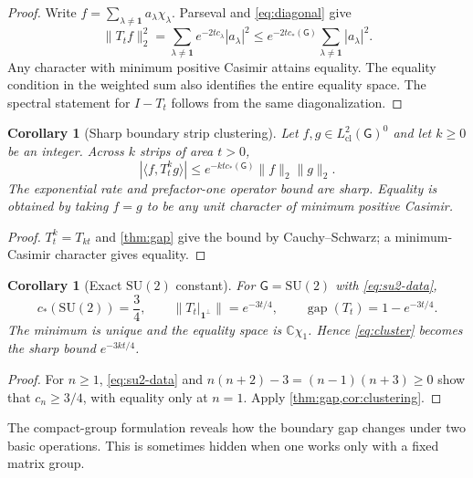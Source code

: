 \documentclass[11pt]{article}
\newtheorem{corollary}[theorem]{Corollary}
\theoremstyle{remark}
\newcommand{\SU}{\mathrm{SU}(2)}
\newcommand{\G}{\mathsf G}
\newcommand{\HclG}{L^2_{\mathrm{cl}}(\G)}
\newcommand{\ip}[2]{\langle #1,#2\rangle}
\begin{document}
\begin{proof}
Write $f=\sum_{\lambda\ne\mathbf1}a_\lambda\chi_\lambda$.  Parseval and
\eqref{eq:diagonal} give
\[
 \|T_tf\|_2^2
 =\sum_{\lambda\ne\mathbf1}e^{-2tc_\lambda}|a_\lambda|^2
 \le e^{-2tc_*(\G)}\sum_{\lambda\ne\mathbf1}|a_\lambda|^2.
\]
Any character with minimum positive Casimir attains equality.  The equality
condition in the weighted sum also identifies the entire equality space.  The
spectral statement for $I-T_t$ follows from the same diagonalization.
\end{proof}

\begin{corollary}[Sharp boundary strip clustering]\label{cor:clustering}
Let $f,g\in\HclG^0$ and let $k\ge0$ be an integer.  Across $k$ strips of area
$t>0$,
\begin{equation}\label{eq:cluster}
 |\ip{f}{T_t^kg}|\le e^{-ktc_*(\G)}\|f\|_2\|g\|_2.
\end{equation}
The exponential rate and prefactor-one operator bound are sharp.  Equality is
obtained by taking $f=g$ to be any unit character of minimum positive Casimir.
\end{corollary}

\begin{proof}
$T_t^k=T_{kt}$ and \cref{thm:gap} give the bound by Cauchy--Schwarz; a minimum-
Casimir character gives equality.
\end{proof}

\begin{corollary}[Exact $\SU$ constant]\label{cor:su2}
For $\G=\SU$ with \eqref{eq:su2-data},
\[
 c_*(\SU)=\frac34,\qquad
 \|T_t|_{\mathbf1^\perp}\|=e^{-3t/4},\qquad
 \operatorname{gap}(T_t)=1-e^{-3t/4}.
\]
The minimum is unique and the equality space is $\mathbb C\chi_1$.  Hence
\eqref{eq:cluster} becomes the sharp bound $e^{-3kt/4}$.
\end{corollary}

\begin{proof}
For $n\ge1$, \eqref{eq:su2-data} and
$n(n+2)-3=(n-1)(n+3)\ge0$ show that $c_n\ge3/4$, with equality only at $n=1$.
Apply \cref{thm:gap,cor:clustering}.
\end{proof}

The compact-group formulation reveals how the boundary gap changes under two
basic operations.  This is sometimes hidden when one works only with a fixed
matrix group.
\end{document}
